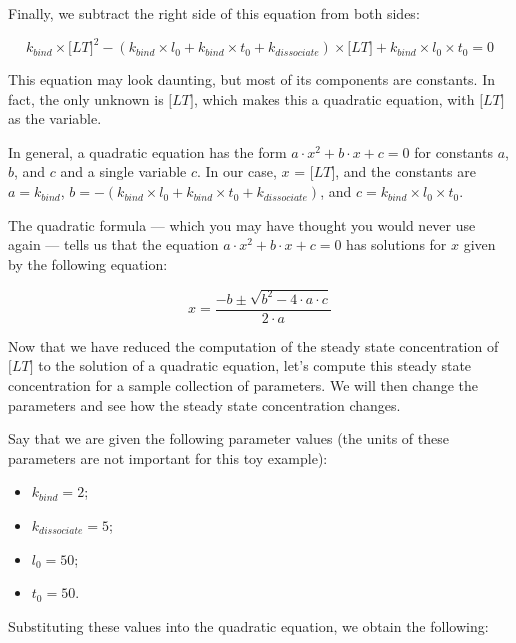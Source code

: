 Finally, we subtract the right side of this equation from both sides:

$$k_{bind} \times \text{[}LT\text{]}^2 - (k_{bind} \times l_0 + k_{bind} \times t_0 + k_{dissociate}) \times \text{[}LT\text{]} + k_{bind} \times l_0 \times t_0 = 0$$

This equation may look daunting, but most of its components are constants. In fact, the only unknown is $\text{[}LT\text{]}$, which makes this a quadratic equation, with $\text{[}LT\text{]}$ as the variable.

In general, a quadratic equation has the form $a \cdot x^2 + b \cdot x + c = 0$ for constants $a$, $b$, and $c$ and a single variable $c$. In our case, $x$ = $\text{[}LT\text{]}$, and the constants are $a = k_{bind}$, $b = - (k_{bind} \times l_0 + k_{bind} \times t_0 + k_{dissociate})$, and $c = k_{bind} \times l_0 \times t_0$.

The quadratic formula --- which you may have thought you would never use again --- tells us that the equation $a \cdot x^2 + b \cdot x + c = 0$  has solutions for $x$ given by the following equation:

$$x = \frac{-b \pm \sqrt{b^2 - 4 \cdot a \cdot c}}{2 \cdot a}$$

\begin{qbox}\end{qbox}

Now that we have reduced the computation of the steady state concentration of $\text{[}LT\text{]}$ to the solution of a quadratic equation, let's compute this steady state concentration for a sample collection of parameters. We will then change the parameters and see how the steady state concentration changes.

Say that we are given the following parameter values (the units of these parameters are not important for this toy example):
\begin{itemize}
 \item $ k_{bind}= 2$;
 \item $k_{dissociate} = 5$;
 \item $l_0 = 50$;
 \item $t_0 = 50$.
\end{itemize}

Substituting these values into the quadratic equation, we obtain the following:

